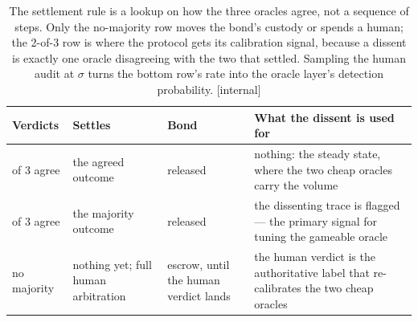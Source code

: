 \begin{table}[H]
\centering
\caption{The settlement rule is a lookup on how the three oracles agree, not a sequence of steps. Only the no-majority row moves the bond's custody or spends a human; the 2-of-3 row is where the protocol gets its calibration signal, because a dissent is exactly one oracle disagreeing with the two that settled. Sampling the human audit at $\sigma$ turns the bottom row's rate into the oracle layer's detection probability. [internal]}
\label{tab:bc-settlement-rule}
\small
\renewcommand{\arraystretch}{1.2}
\begin{tabularx}{\linewidth}{@{}>{\raggedright\arraybackslash}p{1.55cm} >{\raggedright\arraybackslash}p{2.35cm} >{\raggedright\arraybackslash}p{2.25cm} >{\raggedright\arraybackslash}X@{}}
\toprule
\textbf{Verdicts} & \textbf{Settles} & \textbf{Bond} & \textbf{What the dissent is used for} \\
\midrule
3 of 3 agree & the agreed outcome & released & nothing: the steady state, where the two cheap oracles carry the volume \\
2 of 3 agree & the majority outcome & released & the dissenting trace is flagged --- the primary signal for tuning the gameable oracle \\
no majority & nothing yet; full human arbitration & escrow, until the human verdict lands & the human verdict is the authoritative label that re-calibrates the two cheap oracles \\
\bottomrule
\end{tabularx}
\end{table}
